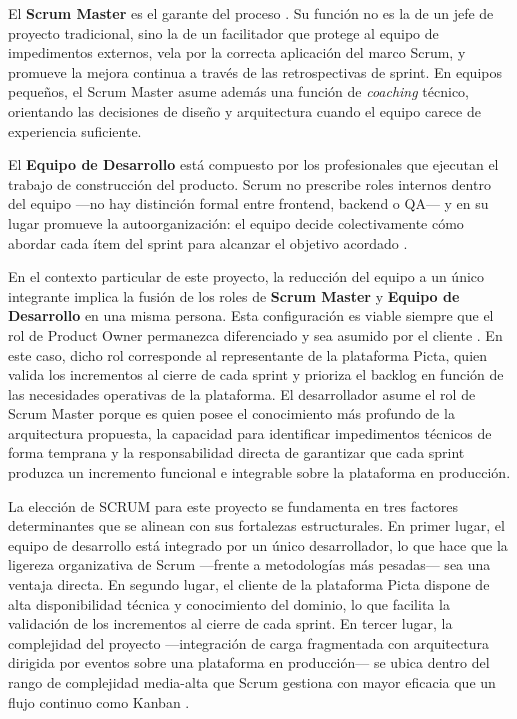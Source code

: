 El \textbf{Scrum Master} es el garante del proceso \citep{Avizienis2004}. Su función no es la de
un jefe de proyecto tradicional, sino la de un facilitador que protege al equipo de impedimentos
externos, vela por la correcta aplicación del marco Scrum, y promueve la mejora continua a través
de las retrospectivas de sprint. En equipos pequeños, el Scrum Master asume además una función de
\textit{coaching} técnico, orientando las decisiones de diseño y arquitectura cuando el equipo
carece de experiencia suficiente.

El \textbf{Equipo de Desarrollo} está compuesto por los profesionales que ejecutan el trabajo de
construcción del producto. Scrum no prescribe roles internos dentro del equipo ---no hay
distinción formal entre frontend, backend o QA--- y en su lugar promueve la autoorganización: el
equipo decide colectivamente cómo abordar cada ítem del sprint para alcanzar el objetivo acordado
\citep{Cohn2004}.

En el contexto particular de este proyecto, la reducción del equipo a un único integrante implica
la fusión de los roles de \textbf{Scrum Master} y \textbf{Equipo de Desarrollo} en una misma
persona. Esta configuración es viable siempre que el rol de Product Owner permanezca diferenciado
y sea asumido por el cliente \citep{Pierra2022}. En este caso, dicho rol corresponde al
representante de la plataforma Picta, quien valida los incrementos al cierre de cada sprint y
prioriza el backlog en función de las necesidades operativas de la plataforma. El desarrollador
asume el rol de Scrum Master porque es quien posee el conocimiento más profundo de la arquitectura
propuesta, la capacidad para identificar impedimentos técnicos de forma temprana y la
responsabilidad directa de garantizar que cada sprint produzca un incremento funcional e integrable
sobre la plataforma en producción.

La elección de SCRUM para este proyecto se fundamenta en tres factores determinantes que se alinean
con sus fortalezas estructurales. En primer lugar, el equipo de desarrollo está integrado por un
único desarrollador, lo que hace que la ligereza organizativa de Scrum ---frente a metodologías
más pesadas--- sea una ventaja directa. En segundo lugar, el cliente de la plataforma Picta dispone
de alta disponibilidad técnica y conocimiento del dominio, lo que facilita la validación de los
incrementos al cierre de cada sprint. En tercer lugar, la complejidad del proyecto ---integración
de carga fragmentada con arquitectura dirigida por eventos sobre una plataforma en producción---
se ubica dentro del rango de complejidad media-alta que Scrum gestiona con mayor eficacia que un
flujo continuo como Kanban \citep{Schwaber2020}.

